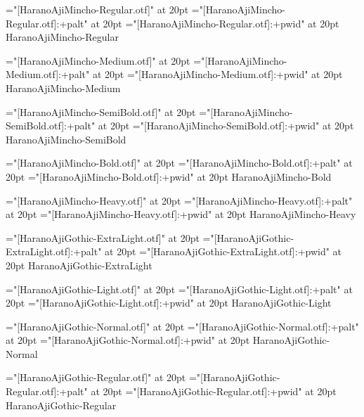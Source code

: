\test
\vfil
\eject

\font\fnone="[HaranoAjiMincho-Regular.otf]" at 20pt
\font\fpalt="[HaranoAjiMincho-Regular.otf]:+palt" at 20pt
\font\fpwid="[HaranoAjiMincho-Regular.otf]:+pwid" at 20pt
\fnone HaranoAjiMincho-Regular

\test
\vfil
\eject

\font\fnone="[HaranoAjiMincho-Medium.otf]" at 20pt
\font\fpalt="[HaranoAjiMincho-Medium.otf]:+palt" at 20pt
\font\fpwid="[HaranoAjiMincho-Medium.otf]:+pwid" at 20pt
\fnone HaranoAjiMincho-Medium

\test
\vfil
\eject

\font\fnone="[HaranoAjiMincho-SemiBold.otf]" at 20pt
\font\fpalt="[HaranoAjiMincho-SemiBold.otf]:+palt" at 20pt
\font\fpwid="[HaranoAjiMincho-SemiBold.otf]:+pwid" at 20pt
\fnone HaranoAjiMincho-SemiBold

\test
\vfil
\eject

\font\fnone="[HaranoAjiMincho-Bold.otf]" at 20pt
\font\fpalt="[HaranoAjiMincho-Bold.otf]:+palt" at 20pt
\font\fpwid="[HaranoAjiMincho-Bold.otf]:+pwid" at 20pt
\fnone HaranoAjiMincho-Bold

\test
\vfil
\eject

\font\fnone="[HaranoAjiMincho-Heavy.otf]" at 20pt
\font\fpalt="[HaranoAjiMincho-Heavy.otf]:+palt" at 20pt
\font\fpwid="[HaranoAjiMincho-Heavy.otf]:+pwid" at 20pt
\fnone HaranoAjiMincho-Heavy

\test
\vfil
\eject

\font\fnone="[HaranoAjiGothic-ExtraLight.otf]" at 20pt
\font\fpalt="[HaranoAjiGothic-ExtraLight.otf]:+palt" at 20pt
\font\fpwid="[HaranoAjiGothic-ExtraLight.otf]:+pwid" at 20pt
\fnone HaranoAjiGothic-ExtraLight

\test
\vfil
\eject

\font\fnone="[HaranoAjiGothic-Light.otf]" at 20pt
\font\fpalt="[HaranoAjiGothic-Light.otf]:+palt" at 20pt
\font\fpwid="[HaranoAjiGothic-Light.otf]:+pwid" at 20pt
\fnone HaranoAjiGothic-Light

\test
\vfil
\eject

\font\fnone="[HaranoAjiGothic-Normal.otf]" at 20pt
\font\fpalt="[HaranoAjiGothic-Normal.otf]:+palt" at 20pt
\font\fpwid="[HaranoAjiGothic-Normal.otf]:+pwid" at 20pt
\fnone HaranoAjiGothic-Normal

\test
\vfil
\eject

\font\fnone="[HaranoAjiGothic-Regular.otf]" at 20pt
\font\fpalt="[HaranoAjiGothic-Regular.otf]:+palt" at 20pt
\font\fpwid="[HaranoAjiGothic-Regular.otf]:+pwid" at 20pt
\fnone HaranoAjiGothic-Regular

